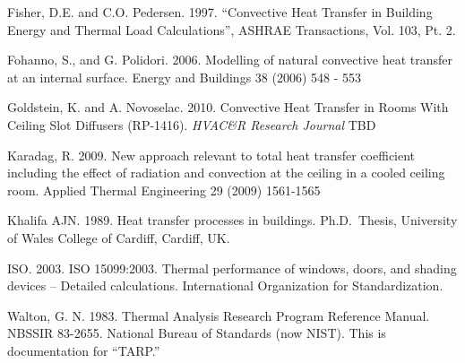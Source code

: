 Fisher, D.E. and C.O. Pedersen. 1997. ``Convective Heat Transfer in Building Energy and Thermal Load Calculations'', ASHRAE Transactions, Vol. 103, Pt. 2.

Fohanno, S., and G. Polidori. 2006. Modelling of natural convective heat transfer at an internal surface. Energy and Buildings 38 (2006) 548 - 553

Goldstein, K. and A. Novoselac. 2010. Convective Heat Transfer in Rooms With Ceiling Slot Diffusers (RP-1416). \emph{HVAC\&R Research Journal} TBD

Karadag, R. 2009. New approach relevant to total heat transfer coefficient including the effect of radiation and convection at the ceiling in a cooled ceiling room. Applied Thermal Engineering 29 (2009) 1561-1565

Khalifa AJN. 1989. Heat transfer processes in buildings. Ph.D.~Thesis, University of Wales College of Cardiff, Cardiff, UK.

ISO. 2003. ISO 15099:2003. Thermal performance of windows, doors, and shading devices -- Detailed calculations. International Organization for Standardization.

Walton, G. N. 1983. Thermal Analysis Research Program Reference Manual. NBSSIR 83-2655. National Bureau of Standards (now NIST). This is documentation for ``TARP.''
